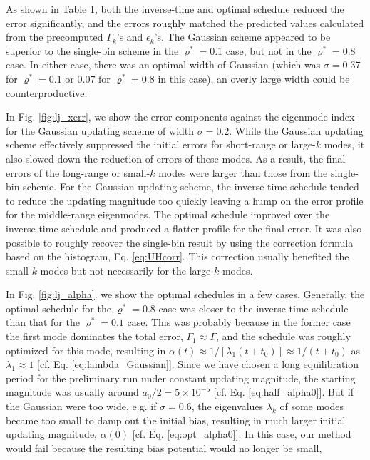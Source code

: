 \documentclass[reprint, superscriptaddress, floatfix]{revtex4-1}
\begin{document}
As shown in Table 1,
both the inverse-time and optimal schedule reduced
the error significantly,
and the errors roughly matched the predicted values
calculated from the precomputed $\Gamma_k$'s and $\epsilon_k$'s.
%
The Gaussian scheme appeared to be superior
to the single-bin scheme in the $\varrho^* = 0.1$ case,
but not in the $\varrho^* = 0.8$ case.
%
In either case, there was an optimal width of Gaussian
(which was $\sigma = 0.37$ for $\varrho^* = 0.1$
or $0.07$ for $\varrho^* = 0.8$ in this case),
an overly large width could be counterproductive.

In Fig. \ref{fig:lj_xerr},
we show the error components against the eigenmode index
for the Gaussian updating scheme of width $\sigma = 0.2$.
%
While the Gaussian updating scheme effectively suppressed
the initial errors for short-range or large-$k$ modes,
it also slowed down the reduction of errors of these modes.
%
As a result, the final errors of the long-range or small-$k$ modes
were larger than those from the single-bin scheme.
%
For the Gaussian updating scheme,
the inverse-time schedule tended to reduce the updating magnitude
too quickly
leaving a hump on the error profile for the middle-range eigenmodes.
%
The optimal schedule improved over the inverse-time schedule
and produced a flatter profile for the final error.
%
It was also possible to roughly
recover the single-bin result by using the correction formula
based on the histogram, Eq. \eqref{eq:UHcorr}.
%
This correction usually benefited the small-$k$ modes
but not necessarily for the large-$k$ modes.


In Fig. \ref{fig:lj_alpha}. 
we show the optimal schedules in a few cases.
%
Generally, the optimal schedule
for the $\varrho^* = 0.8$ case
was closer to the inverse-time schedule
than that for the $\varrho^* = 0.1$ case.
%
This was probably because in the former case
the first mode dominates the total error,
$\Gamma_1 \approx \Gamma$,
and the schedule was roughly optimized for this mode,
resulting in
$\alpha(t) \approx 1/[\lambda_1 (t + t_0)] \approx 1/(t+t_0)$
as $\lambda_1 \approx 1$
[cf. Eq. \eqref{eq:lambda_Gaussian}].
%
Since we have chosen a long equilibration period
for the preliminary run under constant updating magnitude,
the starting magnitude was usually around $a_0/2 = 5\times10^{-5}$
[cf. Eq. \eqref{eq:half_alpha0}].
%
But if the Gaussian were too wide,
e.g. if $\sigma = 0.6$,
the eigenvalues $\lambda_k$ of some modes
became too small to damp out the initial bias,
resulting in much larger initial updating magnitude, $\alpha(0)$
[cf. Eq. \eqref{eq:opt_alpha0}].
%
In this case, our method would fail
because the resulting bias potential would no longer be small,
\end{document}
